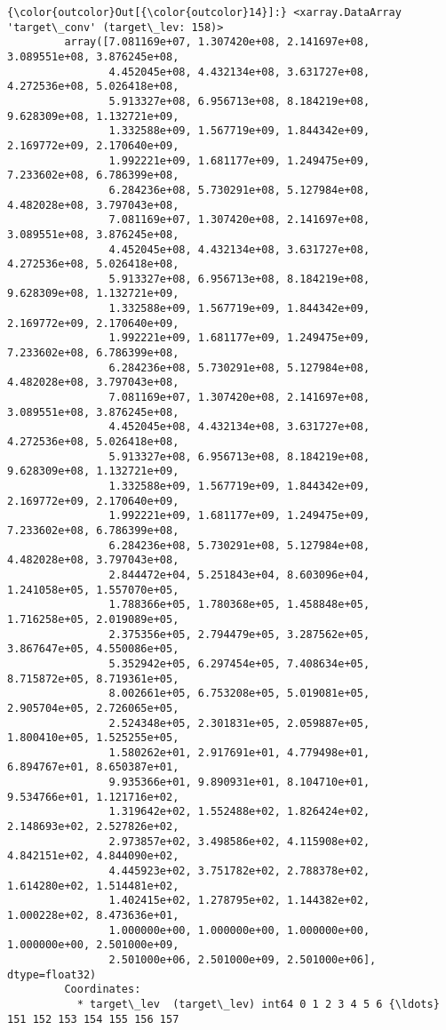 \documentclass[11pt]{article}
\begin{document}
\begin{Verbatim}[commandchars=\\\{\}]
{\color{outcolor}Out[{\color{outcolor}14}]:} <xarray.DataArray 'target\_conv' (target\_lev: 158)>
         array([7.081169e+07, 1.307420e+08, 2.141697e+08, 3.089551e+08, 3.876245e+08,
                4.452045e+08, 4.432134e+08, 3.631727e+08, 4.272536e+08, 5.026418e+08,
                5.913327e+08, 6.956713e+08, 8.184219e+08, 9.628309e+08, 1.132721e+09,
                1.332588e+09, 1.567719e+09, 1.844342e+09, 2.169772e+09, 2.170640e+09,
                1.992221e+09, 1.681177e+09, 1.249475e+09, 7.233602e+08, 6.786399e+08,
                6.284236e+08, 5.730291e+08, 5.127984e+08, 4.482028e+08, 3.797043e+08,
                7.081169e+07, 1.307420e+08, 2.141697e+08, 3.089551e+08, 3.876245e+08,
                4.452045e+08, 4.432134e+08, 3.631727e+08, 4.272536e+08, 5.026418e+08,
                5.913327e+08, 6.956713e+08, 8.184219e+08, 9.628309e+08, 1.132721e+09,
                1.332588e+09, 1.567719e+09, 1.844342e+09, 2.169772e+09, 2.170640e+09,
                1.992221e+09, 1.681177e+09, 1.249475e+09, 7.233602e+08, 6.786399e+08,
                6.284236e+08, 5.730291e+08, 5.127984e+08, 4.482028e+08, 3.797043e+08,
                7.081169e+07, 1.307420e+08, 2.141697e+08, 3.089551e+08, 3.876245e+08,
                4.452045e+08, 4.432134e+08, 3.631727e+08, 4.272536e+08, 5.026418e+08,
                5.913327e+08, 6.956713e+08, 8.184219e+08, 9.628309e+08, 1.132721e+09,
                1.332588e+09, 1.567719e+09, 1.844342e+09, 2.169772e+09, 2.170640e+09,
                1.992221e+09, 1.681177e+09, 1.249475e+09, 7.233602e+08, 6.786399e+08,
                6.284236e+08, 5.730291e+08, 5.127984e+08, 4.482028e+08, 3.797043e+08,
                2.844472e+04, 5.251843e+04, 8.603096e+04, 1.241058e+05, 1.557070e+05,
                1.788366e+05, 1.780368e+05, 1.458848e+05, 1.716258e+05, 2.019089e+05,
                2.375356e+05, 2.794479e+05, 3.287562e+05, 3.867647e+05, 4.550086e+05,
                5.352942e+05, 6.297454e+05, 7.408634e+05, 8.715872e+05, 8.719361e+05,
                8.002661e+05, 6.753208e+05, 5.019081e+05, 2.905704e+05, 2.726065e+05,
                2.524348e+05, 2.301831e+05, 2.059887e+05, 1.800410e+05, 1.525255e+05,
                1.580262e+01, 2.917691e+01, 4.779498e+01, 6.894767e+01, 8.650387e+01,
                9.935366e+01, 9.890931e+01, 8.104710e+01, 9.534766e+01, 1.121716e+02,
                1.319642e+02, 1.552488e+02, 1.826424e+02, 2.148693e+02, 2.527826e+02,
                2.973857e+02, 3.498586e+02, 4.115908e+02, 4.842151e+02, 4.844090e+02,
                4.445923e+02, 3.751782e+02, 2.788378e+02, 1.614280e+02, 1.514481e+02,
                1.402415e+02, 1.278795e+02, 1.144382e+02, 1.000228e+02, 8.473636e+01,
                1.000000e+00, 1.000000e+00, 1.000000e+00, 1.000000e+00, 2.501000e+09,
                2.501000e+06, 2.501000e+09, 2.501000e+06], dtype=float32)
         Coordinates:
           * target\_lev  (target\_lev) int64 0 1 2 3 4 5 6 {\ldots} 151 152 153 154 155 156 157
\end{Verbatim}
            
\end{document}
